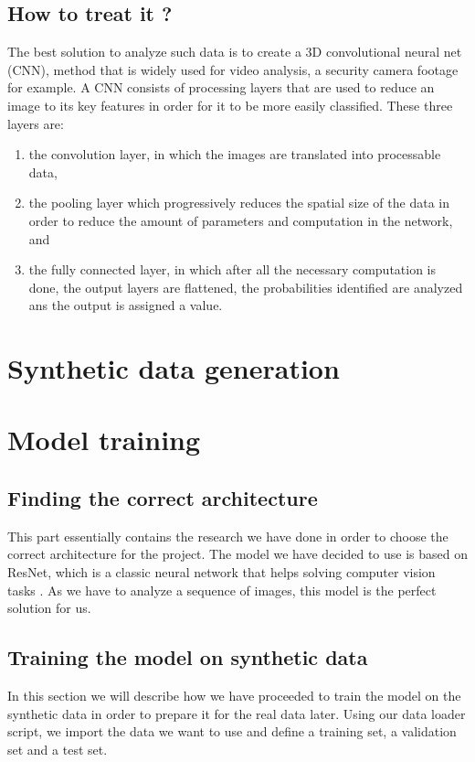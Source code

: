 \documentclass[10pt,conference,compsocconf]{IEEEtran}
\begin{document}
\subsection{How to treat it ?}
The best solution to analyze such data is to create a 3D convolutional neural net (CNN), method that is widely used for video analysis, a security camera footage for example. A CNN consists of processing layers that are used to reduce an image to its key features in order for it to be more easily classified. These three layers are:
\begin{enumerate}
  \item the convolution layer, in which the images are translated into processable data,
  \item the pooling layer which progressively reduces the spatial size of the data in order to reduce the amount of parameters and computation in the network, and
  \item the fully connected layer, in which after all the necessary computation is done, the output layers are flattened, the probabilities identified are analyzed ans the output is assigned a value.
\end{enumerate}

\section{Synthetic data generation}

\section{Model training}
\subsection{Finding the correct architecture}
This part essentially contains the research we have done in order to choose the correct architecture for the project. The model we have decided to use is based on ResNet, which is a classic neural network that helps solving computer vision tasks \cite{hara3dcnns}. As we have to analyze a sequence of images, this model is the perfect solution for us.

\subsection{Training the model on synthetic data}
In this section we will describe how we have proceeded to train the model on the synthetic data in order to prepare it for the real data later. Using our data loader script, we import the data we want to use and define a training set, a validation set and a test set.
\end{document}
